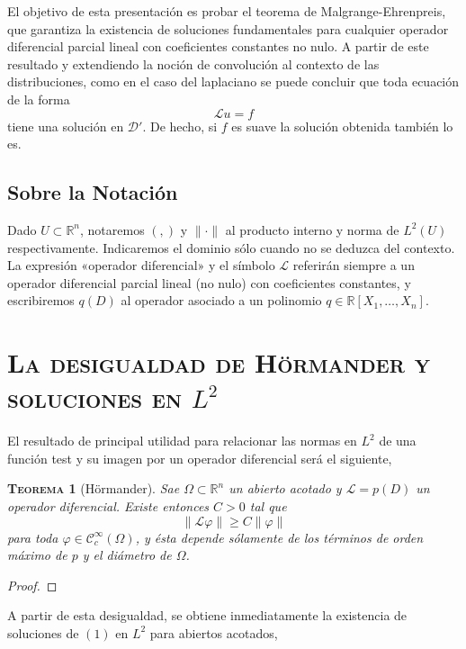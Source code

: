 \documentclass[11pt]{article}
\theoremstyle{colored}
\newtheorem{theorem}{\scshape Teorema}
\newcommand{\R}{\mathbb{R}}
\newcommand{\test}{\mathscr{D}}
\newcommand{\dist}{\test'}
\newcommand{\ip}[1]{( #1 )}
\newcommand{\guill}[1]{«#1»}
\renewcommand{\L}{\mathscr{L}}
\begin{document}
El objetivo de esta presentación es probar el teorema de Malgrange-Ehrenpreis, que garantiza la existencia de soluciones fundamentales para cualquier operador diferencial parcial lineal con coeficientes constantes no nulo. A partir de este resultado y extendiendo la noción de convolución al contexto de las distribuciones, como en el caso del laplaciano se puede concluir que toda ecuación de la forma
\[
\L u = f \tag{$1$}
\]
tiene una solución en $\dist$. De hecho, si $f$ es suave la solución obtenida también lo es. 

\subsection{Sobre la Notación}

Dado $U \subset \R^n$, notaremos $\ip{,}$ y $\|\cdot\|$ al producto interno y norma de $L^2(U)$ respectivamente. Indicaremos el dominio sólo cuando no se deduzca del contexto. La expresión \guill{operador diferencial} y el símbolo $\L$ referirán siempre a un operador diferencial parcial lineal (no nulo) con coeficientes constantes, y escribiremos $q(D)$ al operador asociado a un polinomio $q \in \R[X_1, \dots, X_n]$.

\section{\scshape La desigualdad de Hörmander y soluciones en $L^2$}

El resultado de principal utilidad para relacionar las normas en $L^2$ de una función test y su imagen por un operador diferencial será el siguiente,

\begin{theorem}[Hörmander] Sae $\Omega \subset \R^n$ un abierto acotado y $\L = p(D)$ un operador diferencial. Existe entonces $C > 0$ tal que
\[
\|\L\varphi\| \geq C\|\varphi\|
\]
para toda $\varphi \in \mathscr{C}_c^\infty(\Omega)$, y ésta depende sólamente de los términos de orden máximo de $p$ y el diámetro de $\Omega$.
\end{theorem}
\begin{proof} 
\end{proof}

A partir de esta desigualdad, se obtiene inmediatamente la existencia de soluciones de $(1)$ en $L^2$ para abiertos acotados,
\end{document}
